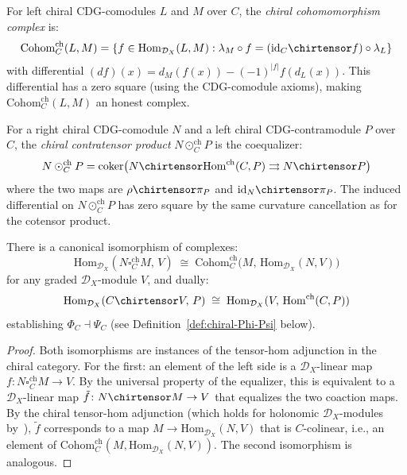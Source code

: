 \begin{definition}\label{def:chiral-cohom}
For left chiral CDG-comodules $L$ and $M$ over $C$, the
\emph{chiral cohomomorphism complex} is:
\[
\mathrm{Cohom}_C^{\mathrm{ch}}(L, M) =
\{f \in \mathrm{Hom}_{\mathcal{D}_X}(L, M) :
\lambda_M \circ f = (\mathrm{id}_C \chirtensor f) \circ \lambda_L\}
\]
with differential $(d f)(x) = d_M(f(x)) - (-1)^{|f|} f(d_L(x))$.
This differential has a zero square (using the CDG-comodule axioms),
making $\mathrm{Cohom}_C^{\mathrm{ch}}(L, M)$ an honest complex.
\end{definition}

\begin{definition}\label{def:chiral-contratensor}
For a right chiral CDG-comodule $N$ and a left chiral
CDG-contramodule $P$ over $C$, the \emph{chiral contratensor
product} $N \odot_C^{\mathrm{ch}} P$ is the coequalizer:
\[
N \odot_C^{\mathrm{ch}} P =
\mathrm{coker}\bigl(
N \chirtensor \mathrm{Hom}^{\mathrm{ch}}(C, P) \rightrightarrows N \chirtensor P
\bigr)
\]
where the two maps are
$\rho \chirtensor \pi_P$ and $\mathrm{id}_N \chirtensor \pi_P$.
The induced differential on $N \odot_C^{\mathrm{ch}} P$ has zero
square by the same curvature cancellation as for the cotensor product.
\end{definition}

\begin{lemma}\label{lem:chiral-co-contra-adjunction}
There is a canonical isomorphism of complexes:
\[
\mathrm{Hom}_{\mathcal{D}_X}(N \square_C^{\mathrm{ch}} M,\, V)
\;\cong\;
\mathrm{Cohom}_C^{\mathrm{ch}}\bigl(M,\,
\mathrm{Hom}_{\mathcal{D}_X}(N, V)\bigr)
\]
for any graded $\mathcal{D}_X$-module $V$, and dually:
\[
\mathrm{Hom}_{\mathcal{D}_X}(C \chirtensor V,\, P)
\;\cong\;
\mathrm{Hom}_{\mathcal{D}_X}(V,\,
\mathrm{Hom}^{\mathrm{ch}}(C, P))
\]
establishing $\Phi_C \dashv \Psi_C$
(see Definition~\textup{\ref{def:chiral-Phi-Psi}} below).
\end{lemma}

\begin{proof}
Both isomorphisms are instances of the tensor-hom adjunction in the
chiral category.  For the first: an element of the left side is a
$\mathcal{D}_X$-linear map $f\colon N \square_C^{\mathrm{ch}} M \to V$.
By the universal property of the equalizer, this is equivalent to a
$\mathcal{D}_X$-linear map $\tilde{f}\colon N \chirtensor M \to V$
that equalizes the two coaction maps.  By the chiral tensor-hom
adjunction (which holds for holonomic $\mathcal{D}_X$-modules
by~\cite[Proposition~3.4.6]{BD04}), $\tilde{f}$ corresponds to a map
$M \to \mathrm{Hom}_{\mathcal{D}_X}(N, V)$ that is
$C$-colinear, i.e., an element of
$\mathrm{Cohom}_C^{\mathrm{ch}}(M, \mathrm{Hom}_{\mathcal{D}_X}(N, V))$.
The second isomorphism is analogous.
\end{proof}

